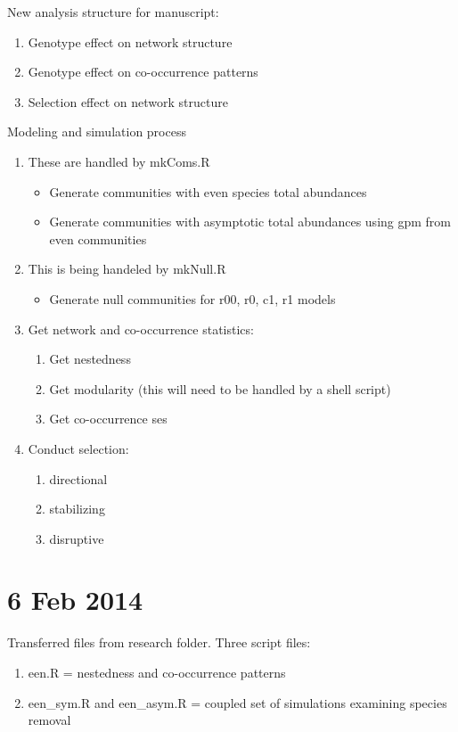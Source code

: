 \documentclass[12pt]{article}
\begin{document}
New analysis structure for manuscript:

\begin{enumerate}
\item Genotype effect on network structure
\item Genotype effect on co-occurrence patterns
\item Selection effect on network structure
\end{enumerate}

Modeling and simulation process
\begin{enumerate}
\item These are handled by mkComs.R
  \begin{itemize}
  \item Generate communities with even species total abundances
  \item Generate communities with asymptotic total abundances using gpm
    from even communities
  \end{itemize}
\item This is being handeled by mkNull.R
  \begin{itemize}
  \item Generate null communities for r00, r0, c1, r1 models
  \end{itemize}
\item Get network and co-occurrence statistics:
  \begin{enumerate}
  \item Get nestedness 
  \item Get modularity (this will need to be handled by a shell script)
  \item Get co-occurrence ses
  \end{enumerate}
\item Conduct selection:
  \begin{enumerate}
  \item directional
  \item stabilizing
  \item disruptive
  \end{enumerate}
\end{enumerate}

\section{6 Feb 2014}

Transferred files from research folder. Three script files:

\begin{enumerate}
\item een.R = nestedness and co-occurrence patterns
\item een_sym.R and een_asym.R = coupled set of simulations examining
  species removal
\end{enumerate}
\end{document}
